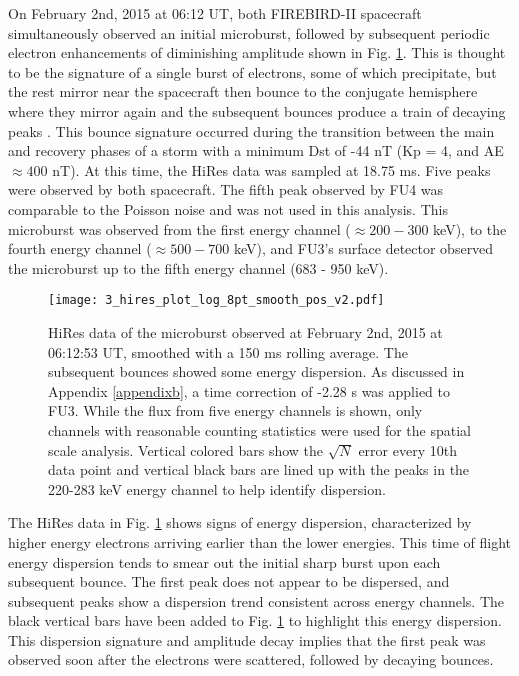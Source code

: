 On February 2nd, 2015 at 06:12 UT, both FIREBIRD-II spacecraft simultaneously observed an initial microburst, followed by subsequent periodic electron enhancements of diminishing amplitude shown in Fig. \ref{hires_plot}. This is thought to be the signature of a single burst of electrons, some of which precipitate, but the rest mirror near the spacecraft then bounce to the conjugate hemisphere where they mirror again and the subsequent bounces produce a train of decaying peaks \citep{Blake1996, Thorne2005}. This bounce signature occurred during the transition between the main and recovery phases of a storm with a minimum Dst of -44 nT (Kp = 4, and AE ${\approx 400}$ nT). At this time, the HiRes data was sampled at 18.75 ms. Five peaks were observed by both spacecraft. The fifth peak observed by FU4 was comparable to the Poisson noise and was not used in this analysis. This microburst was observed from the first energy channel ($\approx 200-300$ keV), to the fourth energy channel ($\approx 500-700$ keV), and FU3's surface detector observed the microburst up to the fifth energy channel (683 - 950 keV).

\begin{figure}
\texttt{[image: 3\_hires\_plot\_log\_8pt\_smooth\_pos\_v2.pdf]}
\caption{HiRes data of the microburst observed at February 2nd, 2015 at 06:12:53 UT, smoothed with a 150 ms rolling average. The subsequent bounces showed some energy dispersion. As discussed in Appendix \ref{appendixb}, a time correction of -2.28 s was applied to FU3. While the flux from five energy channels is shown, only channels with reasonable counting statistics were used for the spatial scale analysis. Vertical colored bars show the $\sqrt{N}$ error every 10th data point and vertical black bars are lined up with the peaks in the 220-283 keV energy channel to help identify dispersion.}
\label{hires_plot}
\end{figure} 

The HiRes data in Fig. \ref{hires_plot} shows signs of energy dispersion, characterized by higher energy electrons arriving earlier than the lower energies. This time of flight energy dispersion tends to smear out the initial sharp burst upon each subsequent bounce. The first peak does not appear to be dispersed, and subsequent peaks show a dispersion trend consistent across energy channels. The black vertical bars have been added to Fig. \ref{hires_plot} to highlight this energy dispersion. This dispersion signature and amplitude decay implies that the first peak was observed soon after the electrons were scattered, followed by decaying bounces.

